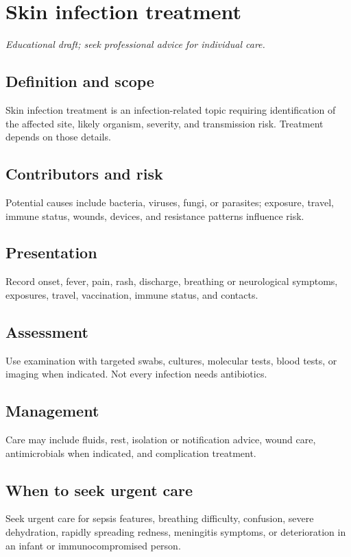 \chapter{Skin infection treatment}
\medskip
\noindent\textit{Educational draft; seek professional advice for individual care.}

\section*{Definition and scope}
Skin infection treatment is an infection-related topic requiring identification of the affected site, likely organism, severity, and transmission risk. Treatment depends on those details.

\section*{Contributors and risk}
Potential causes include bacteria, viruses, fungi, or parasites; exposure, travel, immune status, wounds, devices, and resistance patterns influence risk.

\section*{Presentation}
Record onset, fever, pain, rash, discharge, breathing or neurological symptoms, exposures, travel, vaccination, immune status, and contacts.

\section*{Assessment}
Use examination with targeted swabs, cultures, molecular tests, blood tests, or imaging when indicated. Not every infection needs antibiotics.

\section*{Management}
Care may include fluids, rest, isolation or notification advice, wound care, antimicrobials when indicated, and complication treatment.

\section*{When to seek urgent care}
Seek urgent care for sepsis features, breathing difficulty, confusion, severe dehydration, rapidly spreading redness, meningitis symptoms, or deterioration in an infant or immunocompromised person.

